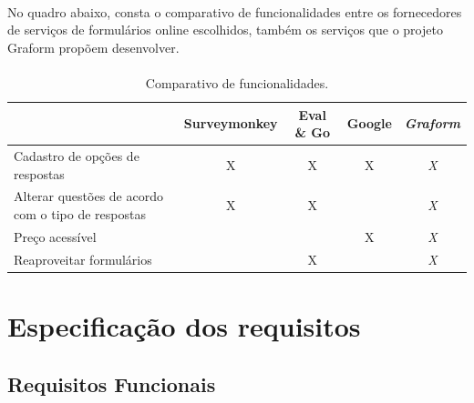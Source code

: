 \documentclass[11pt]{article}
\begin{document}
      \paragraph{}
      
      No quadro abaixo, consta o comparativo de funcionalidades entre os 
      fornecedores de serviços de formulários online escolhidos, também
      os serviços que o projeto Graform propõem desenvolver.

      \paragraph{}

      \begin{table}[h]
        \begin{center}
          \begin{tabular}{ | p{5cm} | c | c | c | c | }
            \hline
                                                                                & Surveymonkey\cellcolor{gray}  & Eval \& Go\cellcolor{gray} & Google\cellcolor{gray} & \em Graform\cellcolor{gray} \\
            \hline
            Cadastro de opções de respostas\cellcolor{gray}                     & X             & X           & X       & \em X \\
            \hline
            Alterar questões de acordo com o tipo de respostas\cellcolor{gray} & X             & X           &         & \em X \\
            \hline
            Preço acessível\cellcolor{gray}                                     &               &             & X       & \em X \\
            \hline
            Reaproveitar formulários\cellcolor{gray}                          &               & X           &         & \em X \\
            \hline
          \end{tabular}
          \caption{Comparativo de funcionalidades.}
        \end{center}
      \end{table}
      
  \newpage

  \section{Especificação dos requisitos}
    
    \subsection{Requisitos Funcionais}
\end{document}
